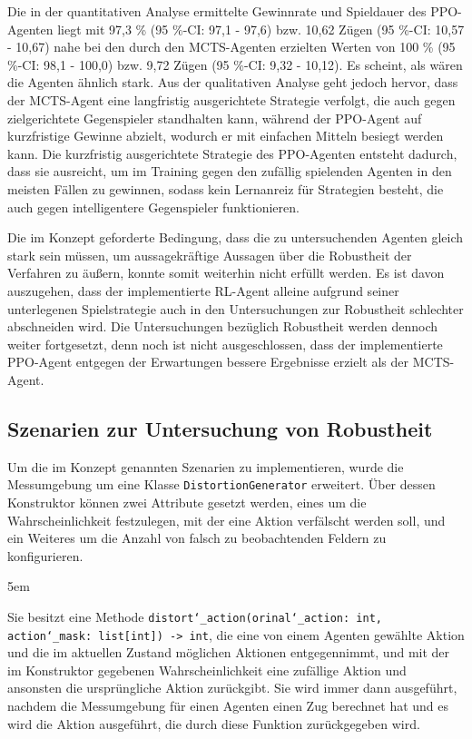 Die in der quantitativen Analyse ermittelte Gewinnrate und Spieldauer des PPO-Agenten liegt mit 97,3 \% (95 \%-CI: 97,1 - 97,6) bzw. 10,62 Zügen (95 \%-CI: 10,57 - 10,67) nahe bei den durch den MCTS-Agenten erzielten Werten von 100 \% (95 \%-CI: 98,1 - 100,0) bzw. 9,72 Zügen (95 \%-CI: 9,32 - 10,12). Es scheint, als wären die Agenten ähnlich stark. Aus der qualitativen Analyse geht jedoch hervor, dass der MCTS-Agent eine langfristig ausgerichtete Strategie verfolgt, die auch gegen zielgerichtete Gegenspieler standhalten kann, während der PPO-Agent auf kurzfristige Gewinne abzielt, wodurch er mit einfachen Mitteln besiegt werden kann. Die kurzfristig ausgerichtete Strategie des PPO-Agenten entsteht dadurch, dass sie ausreicht, um im Training gegen den zufällig spielenden Agenten in den meisten Fällen zu gewinnen, sodass kein Lernanreiz für Strategien besteht, die auch gegen intelligentere Gegenspieler funktionieren.

Die im Konzept geforderte Bedingung, dass die zu untersuchenden Agenten gleich stark sein müssen, um aussagekräftige Aussagen über die Robustheit der Verfahren zu äußern, konnte somit weiterhin nicht erfüllt werden. Es ist davon auszugehen, dass der implementierte RL-Agent alleine aufgrund seiner unterlegenen Spielstrategie auch in den Untersuchungen zur Robustheit schlechter abschneiden wird. Die Untersuchungen bezüglich Robustheit werden dennoch weiter fortgesetzt, denn noch ist nicht ausgeschlossen, dass der implementierte PPO-Agent entgegen der Erwartungen bessere Ergebnisse erzielt als der MCTS-Agent.

\subsection{Szenarien zur Untersuchung von Robustheit}

\label{robustheit-szenarien}

Um die im Konzept genannten Szenarien zu implementieren, wurde die Messumgebung um eine Klasse \texttt{DistortionGenerator} erweitert. Über dessen Konstruktor können zwei Attribute gesetzt werden, eines um die Wahrscheinlichkeit festzulegen, mit der eine Aktion verfälscht werden soll, und ein Weiteres um die Anzahl von falsch zu beobachtenden Feldern zu konfigurieren.


\begingroup

\emergencystretch 5em%

	 Sie besitzt eine Methode \texttt{distort\char`_action(orinal\char`_action: int, action\char`_mask: list[int]) -> int}, die eine von einem Agenten gewählte Aktion und die im aktuellen Zustand möglichen Aktionen entgegennimmt, und mit der im Konstruktor gegebenen Wahrscheinlichkeit eine zufällige Aktion und ansonsten die ursprüngliche Aktion zurückgibt. Sie wird immer dann ausgeführt, nachdem die Messumgebung für einen Agenten einen Zug berechnet hat und es wird die Aktion ausgeführt, die durch diese Funktion zurückgegeben wird.

